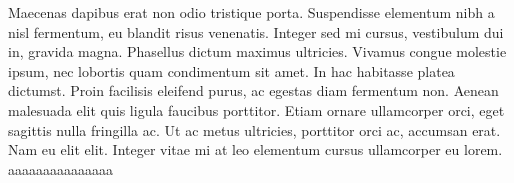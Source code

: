 Maecenas dapibus erat non odio tristique porta. Suspendisse elementum nibh a nisl fermentum, eu blandit risus venenatis. Integer sed mi cursus, vestibulum dui in, gravida magna. Phasellus dictum maximus ultricies. Vivamus congue molestie ipsum, nec lobortis quam condimentum sit amet. In hac habitasse platea dictumst. Proin facilisis eleifend purus, ac egestas diam fermentum non. Aenean malesuada elit quis ligula faucibus porttitor. Etiam ornare ullamcorper orci, eget sagittis nulla fringilla ac. Ut ac metus ultricies, porttitor orci ac, accumsan erat. Nam eu elit elit. Integer vitae mi at leo elementum cursus ullamcorper eu lorem. aaaaaaaaaaaaaaa

